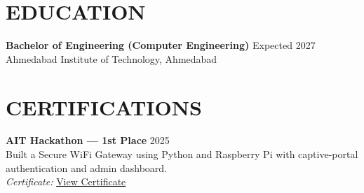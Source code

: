 \documentclass[letterpaper,11pt]{article}
\begin{document}
\section{EDUCATION}
\textbf{Bachelor of Engineering (Computer Engineering)} \hfill Expected 2027 \\
Ahmedabad Institute of Technology, Ahmedabad

\vspace{6pt}

\section{CERTIFICATIONS}
\textbf{AIT Hackathon — 1st Place} \hfill 2025 \\
Built a Secure WiFi Gateway using Python and Raspberry Pi with captive-portal authentication and admin dashboard. \\
\small\textit{Certificate:} \href{https://drive.google.com/file/d/1_bStpQGr8wgqULJqMCemGi_-0lOgMKXD/view?usp=sharing}{View Certificate}
\end{document}
